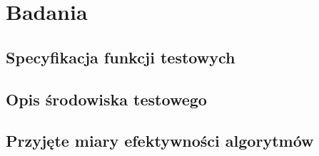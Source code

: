 \newpage
\chapter{Badania}

\section{Specyfikacja funkcji testowych}

\section{Opis środowiska testowego}

\section{Przyjęte miary efektywności algorytmów}